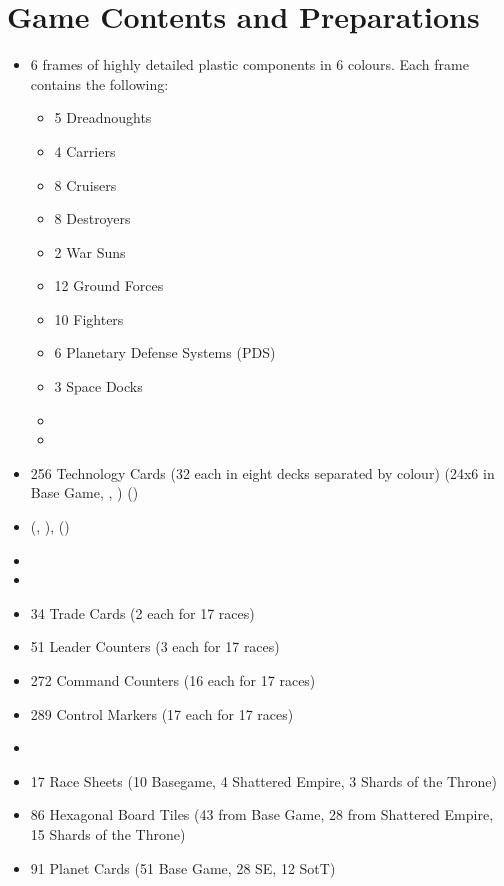 \documentclass[11pt,fleqn]{book} %
\begin{document}
\section{Game Contents and Preparations}

\begin{itemize}
\item 6  frames of highly detailed plastic components in 6 colours. Each frame contains the following:
\begin{itemize}
\item 5 Dreadnoughts
\item 4 Carriers
\item 8 Cruisers
\item 8 Destroyers
\item 2 War Suns
\item 12 Ground Forces
\item 10 Fighters
\item 6 Planetary Defense Systems (PDS)
\item 3 Space Docks
\item {}
\item {}
\end{itemize}
\item 256 Technology Cards (32 each in eight decks separated by colour) (24x6 in Base Game, , ) ()
\item {} (, ), ()
\item {}
\item {}
\item 34 Trade Cards (2 each for 17 races)
\item 51 Leader Counters (3 each for 17 races)
\item 272 Command Counters (16 each for 17 races)
\item 289 Control Markers (17 each for 17 races)
\item {}
\item 17 Race Sheets (10 Basegame, 4 Shattered Empire, 3 Shards of the Throne)
\item 86 Hexagonal Board Tiles (43 from Base Game, 28 from Shattered Empire, 15 Shards of the Throne) 
\item 91 Planet Cards (51 Base Game, 28 SE, 12 SotT)

\end{itemize}
\end{document}
